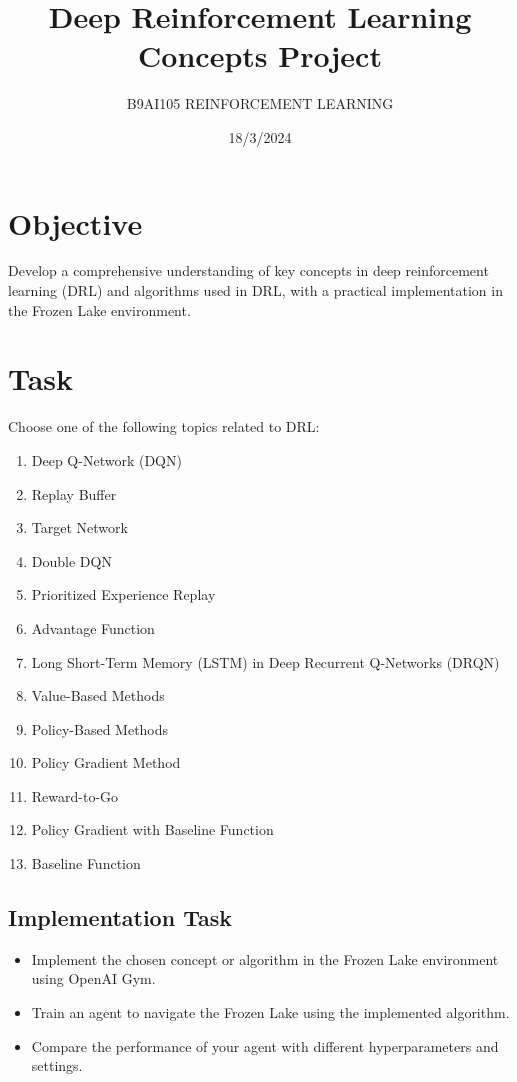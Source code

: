 \documentclass{article}
\title{Deep Reinforcement Learning Concepts Project}
\author{B9AI105 REINFORCEMENT LEARNING}
\date{18/3/2024}
\begin{document}
\maketitle

\section*{Objective}
Develop a comprehensive understanding of key concepts in deep reinforcement learning (DRL) and algorithms used in DRL, with a practical implementation in the Frozen Lake environment.

\section*{Task}
Choose one of the following topics related to DRL:
\begin{enumerate}[label=\arabic*.]
    \item Deep Q-Network (DQN)
    \item Replay Buffer
    \item Target Network
    \item Double DQN
    \item Prioritized Experience Replay
    \item Advantage Function
    \item Long Short-Term Memory (LSTM) in Deep Recurrent Q-Networks (DRQN)
    \item Value-Based Methods
    \item Policy-Based Methods
    \item Policy Gradient Method
    \item Reward-to-Go
    \item Policy Gradient with Baseline Function
    \item Baseline Function
\end{enumerate}

\subsection*{Implementation Task}
\begin{itemize}
    \item Implement the chosen concept or algorithm in the Frozen Lake environment using OpenAI Gym.
    \item Train an agent to navigate the Frozen Lake using the implemented algorithm.
    \item Compare the performance of your agent with different hyperparameters and settings.
\end{itemize}
\end{document}
